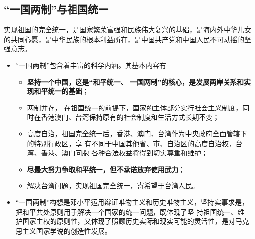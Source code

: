 \documentclass[12pt,openany]{ctexbook}
\begin{document}
\subsection{“一国两制”与祖国统一}
实现祖国的完全统一，是国家繁荣富强和民族伟大复兴的基础，是海内外中华儿女的共同心愿，是中华民族的根本利益所在，是中国共产党和中国人民不可动摇的坚强意志。
\begin{itemize}
  \item “一国两制”包含着丰富的科学内涵。其基本内容有
\begin{itemize}
  \item \textbf{坚持一个中国，这是“和平统一、 一国两制”的核心，是发展两岸关系和实现和平统一的基础}；
  \item 两制并存， 在祖国统一的前提下，国家的主体部分实行社会主义制度，同时在香港澳门、台湾保持原有的社会制度和生活方式长期不变；
  \item 高度自治，祖国完全统一后，香港、澳门、台湾作为中央政府全面管辖下的特别行政区，享 有不同于中国其他省、市、自治区的高度自治权，台湾、香港、澳门同胞 各种合法权益将得到切实尊重和维护；
  \item \textbf{尽最大努力争取和平统一，但不承诺放弃使用武力}；
  \item 解决台湾问题，实现祖国完全统一，寄希望于台湾人民。
\end{itemize}
  \item “一国两制”构想是邓小平运用辩证唯物主义和历史唯物主义，坚持实事求是，把和平共处原则用于解决一个国家的统一问题，既体现了坚 持祖国统一、维护国家主权的原则性，又体现了照顾历史实际和现实可能的灵活性，是对马克思主义国家学说的创造性发展。
\end{itemize}
\end{document}
